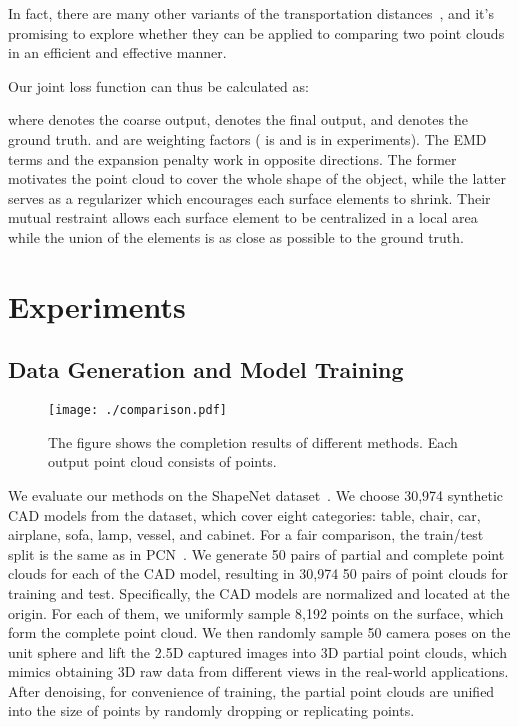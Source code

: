 \documentclass[letterpaper]{article} \usepackage{aaai20}  \usepackage{times}  \usepackage{helvet} \usepackage{courier}  \usepackage[hyphens]{url}  \usepackage{graphicx} \urlstyle{rm} \def\UrlFont{\rm}  \usepackage{graphicx}  \frenchspacing  \setlength{\pdfpagewidth}{8.5in}  \setlength{\pdfpageheight}{11in}  \usepackage{amsmath}
\begin{document}
In fact, there are many other variants of the transportation distances~\cite{cuturi2013sinkhorn,solomon2015convolutional}, and it's promising to explore whether they can be applied to comparing two point clouds in an efficient and effective manner.

Our joint loss function  can thus be calculated as: 
{\small

}
where  denotes the coarse output,  denotes the final output, and  denotes the ground truth.  and  are weighting factors ( is  and  is  in experiments). The EMD terms and the expansion penalty work in opposite directions. The former motivates the point cloud to cover the whole shape of the object, while the latter serves as a regularizer which encourages each surface elements to shrink. Their mutual restraint allows each surface element to be centralized in a local area while the union of the elements is as close as possible to the ground truth.

\section{Experiments}



\subsection{Data Generation and Model Training}

\begin{figure*}[t]
  \centering
  \texttt{[image: ./comparison.pdf]}
  \caption{The figure shows the completion results of different methods. Each output point cloud consists of  points.}\label{fig:comparison}
\end{figure*}

We evaluate our methods on the ShapeNet dataset~\cite{Shapenet}. We choose 30,974 synthetic CAD models from the dataset, which cover eight categories: table, chair, car, airplane, sofa, lamp, vessel, and cabinet. For a fair comparison, the train/test split is the same as in PCN~\cite{yuan2018pcn}. We generate 50 pairs of partial and complete point clouds for each of the CAD model, resulting in 30,974  50 pairs of point clouds for training and test. Specifically, the CAD models are normalized and located at the origin. For each of them, we uniformly sample 8,192 points on the surface, which form the complete point cloud. We then randomly sample 50 camera poses on the unit sphere and lift the 2.5D captured images into 3D partial point clouds, which mimics obtaining 3D raw data from different views in the real-world applications. After denoising, for convenience of training, the partial point clouds are unified into the size of  points by randomly dropping or replicating points.
\end{document}

